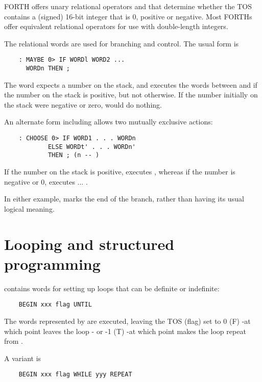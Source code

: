 FORTH offers unary relational operators  and  that determine whether the TOS contains a (signed) 16-bit integer that is 0, positive or negative. Most FORTHs offer equivalent relational operators for use with double-length integers.

The relational words are used for branching and control. The usual form is

\begin{lstlisting}
    : MAYBE 0> IF WORDl WORD2 ...
      WORDn THEN ;
\end{lstlisting}

The word  expects a number on the stack, and executes the words between  and  if the number on the stack is positive, but not otherwise. If the number initially on the stack were negative or zero,  would do nothing.

An alternate form including  allows two mutually exclusive actions:

\begin{lstlisting}
    : CHOOSE 0> IF WORD1 . . . WORDn
            ELSE WORDt' . . . WORDn'
            THEN ; (n -- )
\end{lstlisting}

If the number on the stack is positive,  executes , whereas if the number is negative or 0,  executes  ... .

In either example,  marks the end of the branch, rather than having its usual logical meaning.

\section{Looping and structured programming}

 contains words for setting up loops that can be definite or indefinite:

\begin{lstlisting}
    BEGIN xxx flag UNTIL
\end{lstlisting}

The words represented by  are executed, leaving the TOS (flag) set to 0 (F) -at which point  leaves the loop - or -1 (T) -at which point  makes the loop repeat from .

A variant is
\begin{lstlisting}
    BEGIN xxx flag WHILE yyy REPEAT
\end{lstlisting}

